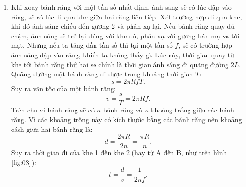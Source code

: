 \begin{enumerate}
    \item  
    Khi xoay bánh răng với một tần số nhất định, ánh sáng sẽ có lúc đập vào răng, sẽ có lúc đi qua khe giữa hai răng liên tiếp. Xét trường hợp đi qua khe, khi đó ánh sáng chiếu đến gương 2 và phản xạ lại. Nếu bánh răng quay đủ chậm, ánh sáng sẽ trở lại đúng với khe đó, phản xạ với gương bán mạ và tới mặt. Nhưng nếu ta tăng dần tần số thì tại một tần số $f$, sẽ có trường hợp ánh sáng đập vào răng, khiến ta không thấy gì. Lúc này, thời gian quay từ khe tới bánh răng thứ hai sẽ chính là thời gian ánh sáng đi quãng đường $2L$. \\

    Quãng đường một bánh răng đi được trong khoảng thời gian $T$:
    \begin{equation}
        s = 2 \pi R f T.
    \end{equation}
    Suy ra vận tốc của một bánh răng:
    \begin{equation}
        v = \frac{s}{T} = 2 \pi R f.
    \end{equation}
    Trên chu vi bánh răng sẽ có $n$ bánh răng và $n$ khoảng trống giữa các bánh răng. Vì các khoảng trống này có kích thước bằng các bánh răng nên khoảng cách giữa hai bánh răng là:
    \begin{equation}
        d = \frac{2 \pi R}{2n} = \frac{\pi R}{n}.
    \end{equation}
    Suy ra thời gian đi của khe 1 đến khe 2 (hay từ A đến B, như trên hình $\ref{fig:03}$):
    \begin{equation}
        t = \frac{d}{v} = \frac{1}{2nf}.
    \end{equation}
    
    \begin{figure}[!h]
    \centering
    \scalebox{0.9}{
    \begin{tikzpicture}[x=0.75pt,y=0.75pt,yscale=-1,xscale=1]
        

\end{tikzpicture}}
\end{figure}
\end{enumerate}
